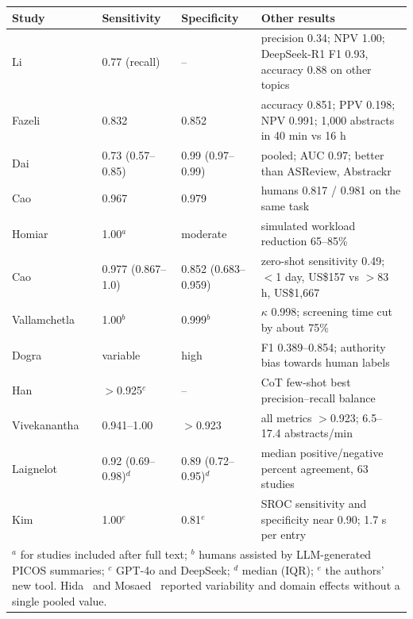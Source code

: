 \documentclass[12pt,a4paper]{article}
\begin{document}
\begin{table}[!htb]
\small
\setlength{\tabcolsep}{4pt}
\renewcommand{\arraystretch}{1.08}
\centering
{}\label{tab:res}
\begin{tabular}{|p{2.7cm}|p{2.5cm}|p{2.5cm}|p{5.2cm}|}
\hline
Study & Sensitivity & Specificity & Other results\\
\hline
Li~\cite{s002} & 0.77 (recall) & -- & precision 0.34; NPV 1.00; DeepSeek-R1 F1 0.93, accuracy 0.88 on other topics\\
\hline
Fazeli~\cite{s008} & 0.832 & 0.852 & accuracy 0.851; PPV 0.198; NPV 0.991; 1,000 abstracts in 40 min vs 16 h\\
\hline
Dai~\cite{s027} & 0.73 (0.57--0.85) & 0.99 (0.97--0.99) & pooled; AUC 0.97; better than ASReview, Abstrackr\\
\hline
Cao~\cite{s031} & 0.967 & 0.979 & humans 0.817 / 0.981 on the same task\\
\hline
Homiar~\cite{s032} & 1.00$^a$ & moderate & simulated workload reduction 65--85\%\\
\hline
Cao~\cite{s033} & 0.977 (0.867--1.0) & 0.852 (0.683--0.959) & zero-shot sensitivity 0.49; $<$1 day, US\$157 vs $>$83 h, US\$1,667\\
\hline
Vallamchetla~\cite{s034} & 1.00$^b$ & 0.999$^b$ & $\kappa$ 0.998; screening time cut by about 75\%\\
\hline
Dogra~\cite{s035} & variable & high & F1 0.389--0.854; authority bias towards human labels\\
\hline
Han~\cite{s036} & $>$0.925$^c$ & -- & CoT few-shot best precision--recall balance\\
\hline
Vivekanantha~\cite{s038} & 0.941--1.00 & $>$0.923 & all metrics $>$0.923; 6.5--17.4 abstracts/min\\
\hline
Laignelot~\cite{s014} & 0.92 (0.69--0.98)$^d$ & 0.89 (0.72--0.95)$^d$ & median positive/negative percent agreement, 63 studies\\
\hline
Kim~\cite{s037} & 1.00$^e$ & 0.81$^e$ & SROC sensitivity and specificity near 0.90; 1.7 s per entry\\
\hline
\multicolumn{4}{|p{13.6cm}|}{\footnotesize $^a$ for studies included after full text; $^b$ humans assisted by LLM-generated PICOS summaries; $^c$ GPT-4o and DeepSeek; $^d$ median (IQR); $^e$ the authors' new tool. Hida~\cite{s009} and Mosaed~\cite{s010} reported variability and domain effects without a single pooled value.}\\
\hline
\end{tabular}
\end{table}
\end{document}
